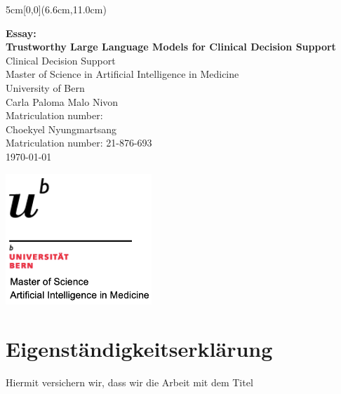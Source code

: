 \documentclass[12pt,a4paper]{scrreprt}
\begin{document}
\begin{titlepage}
	\begin{textblock*}{5cm}[0,0](6.6cm,11.0cm)
	\end{textblock*}
	\begin{center}
		\vspace*{2cm}
    \Huge{\textbf{Essay:}}\\
		\Huge{\textbf{Trustworthy Large Language Models for Clinical Decision Support}}\\
    \vspace{3em}
		\Large{Clinical Decision Support}\\
    \vspace{0.5em}
    \normalsize Master of Science in Artificial Intelligence in Medicine\\
    \normalsize University of Bern\\
		\vspace{10em}
        \Large{Carla Paloma Malo Nivon}\\
        \vspace{0.5em}
        \normalsize Matriculation number: \\
        \vspace{4em}
        \Large{Choekyel Nyungmartsang}\\
        \vspace{0.5em}
        \normalsize Matriculation number: 21-876-693\\
		\vfill
        \Large{\today}\\

    
	\end{center}
 
\newpage

\thispagestyle{empty}
\begin{flushright}
    \includegraphics[width=5.5cm]{university_logo.png} %
\end{flushright}
\vspace{2cm}
\section*{Eigenständigkeitserklärung}
{\small
Hiermit versichern wir, dass wir die Arbeit mit dem Titel

}
\end{titlepage}
\end{document}
